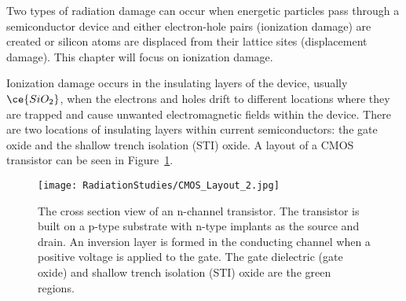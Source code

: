 Two types of radiation damage can occur when energetic particles pass through a semiconductor device and either electron-hole pairs (ionization damage) are created or silicon atoms are displaced from their lattice sites (displacement damage). This chapter will focus on ionization damage. 

Ionization damage occurs in the insulating layers of the device, usually $\ce{SiO_{2}}$, when the electrons and holes drift to different locations where they are trapped and cause unwanted electromagnetic fields within the device. There are two locations of insulating layers within current semiconductors: the gate oxide and the shallow trench isolation (STI) oxide. A layout of a CMOS transistor can be seen in Figure~\ref{fig:CMOS_Layout}\cite{CMOSLayout}.

\begin{figure}[htbp]
\begin{center}
\texttt{[image: RadiationStudies/CMOS\_Layout\_2.jpg]}
\end{center}
\caption{The cross section view of an n-channel transistor. The transistor is built on a p-type substrate with n-type implants as the source and drain. An inversion layer is formed in the conducting channel when a positive voltage is applied to the gate. The gate dielectric (gate oxide) and shallow trench isolation (STI) oxide are the green regions\cite{CMOSLayout}.}
\label{fig:CMOS_Layout}
\end{figure}

